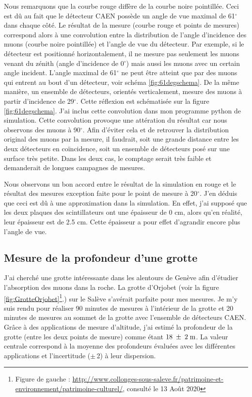 \documentclass[a4paper, 12pt]{article}
\begin{document}
\begin{spacing}{1.5}
Nous remarquons que la courbe rouge diffère de la courbe noire pointillée. Ceci est dû au fait que le détecteur CAEN possède un angle de vue maximal de 61$^{\circ}$ dans chaque côté. Le résultat de la mesure (courbe rouge et points de mesures) correspond alors à une convolution entre la distribution de l'angle d'incidence des muons (courbe noire pointillée) et l'angle de vue du détecteur. Par exemple, si le détecteur est positionné horizontalement, il ne mesure pas seulement les muons venant du zénith (angle d'incidence de 0$^{\circ}$) mais aussi les muons avec un certain angle incident. L'angle maximal de 61$^{\circ}$ ne peut être atteint que par des muons qui entrent au bout d'un détecteur, voir schéma \ref{fig:61degschema}. De la même manière, un ensemble de détecteurs, orientés verticalement, mesure des muons à partir d'incidence de 29$^{\circ}$. Cette réflexion est schématisée sur la figure \ref{fig:61degschema}. J'ai inclus cette convolution dans mon programme python de simulation. Cette convolution provoque une attération du résultat car nous observons des muons à 90$^{\circ}$. Afin d'éviter cela et de retrouver la distribution original des muons par la mesure, il faudrait, soit une grande distance entre les deux détecteurs en coïncidence, soit un ensemble de détecteurs posé sur une surface très petite. Dans les deux cas, le comptage serait très faible et demanderait de longues campagnes de mesures.

Nous observons un bon accord entre le résultat de la simulation en rouge et le résultat des mesures exception faite pour le point de mesure à 20$^{\circ}$. J'en déduis que ceci est dû à une approximation dans la simulation. En effet, j'ai supposé que les deux plaques des scintillateurs ont une épaisseur de 0 cm, alors qu'en réalité, leur épaisseur est de 2.5 cm. Cette épaisseur a pour effet d'agrandir encore plus l'angle de vue.

\subsection{Mesure de la profondeur d'une grotte}

J'ai cherché une grotte intéressante dans les alentours de Genève afin d'étudier l'absorption des muons dans la roche. La grotte d'Orjobet (voir la figure \ref{fig:GrotteOrjobet}\footnote{Figure de gauche : \url{http://www.collonges-sous-saleve.fr/patrimoine-et-environnement/patrimoine-culturel/}, consulté le 13 Août 2020}.) sur le Salève s'avérait parfaite pour mes mesures. Je m'y suis rendu pour réaliser 90 minutes de mesures à l'intérieur de la grotte et 20 minutes de mesures au sommet de la grotte avec l'ensemble de détecteurs CAEN. Grâce à des applications de mesure d'altitude, j'ai estimé la profondeur de la grotte (entre les deux points de mesure) comme étant $18\;\pm\;2\;{\rm m}$. La valeur centrale correspond à la moyenne des profondeurs évaluées avec les différentes applications et l'incertitude ($\pm\,$2) à leur dispersion. 


\end{spacing}
\end{document}
